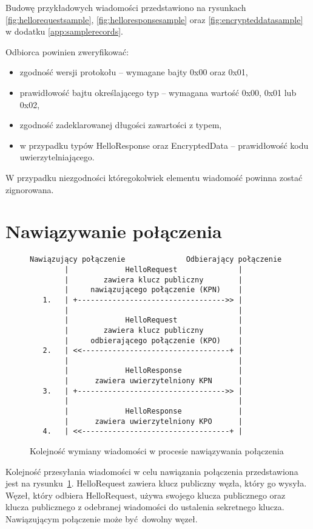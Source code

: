 Budowę przykładowych wiadomości przedstawiono na rysunkach \ref{fig:hellorequestsample}, \ref{fig:helloresponsesample} oraz \ref{fig:encrypteddatasample} w dodatku \ref{app:samplerecords}.

Odbiorca powinien zweryfikować:

\begin{itemize}
\item zgodność wersji protokołu -- wymagane bajty 0x00 oraz 0x01,
\item prawidłowość bajtu określającego typ -- wymagana wartość 0x00, 0x01 lub 0x02,
\item zgodność zadeklarowanej długości zawartości z typem,
\item w przypadku typów HelloResponse oraz EncryptedData -- prawidłowość kodu uwierzytelniającego.
\end{itemize}

W przypadku niezgodności któregokolwiek elementu wiadomość powinna zostać zignorowana.

\section{Nawiązywanie połączenia}

\begin{figure}[h]
\centering
\begin{BVerbatim}
Nawiązujący połączenie              Odbierający połączenie
        |             HelloRequest              |
        |        zawiera klucz publiczny        |
        |     nawiązującego połączenie (KPN)    |
   1.   | +---------------------------------->> |
        |                                       |
        |             HelloRequest              |
        |        zawiera klucz publiczny        |
        |     odbierającego połączenie (KPO)    |
   2.   | <<----------------------------------+ |
        |                                       |
        |             HelloResponse             |
        |      zawiera uwierzytelniony KPN      |
   3.   | +---------------------------------->> |
        |                                       |
        |             HelloResponse             |
        |      zawiera uwierzytelniony KPO      |
   4.   | <<----------------------------------+ |
\end{BVerbatim}
\caption{Kolejność wymiany wiadomości w procesie nawiązywania połączenia}
\label{fig:handshake}
\end{figure}

Kolejność przesyłania wiadomości w celu nawiązania połączenia przedstawiona jest na rysunku~\ref{fig:handshake}. HelloRequest zawiera klucz publiczny węzła, który go wysyła. Węzeł, który odbiera HelloRequest, używa swojego klucza publicznego oraz klucza publicznego z odebranej wiadomości do ustalenia sekretnego klucza. Nawiązującym połączenie może być dowolny węzeł.

